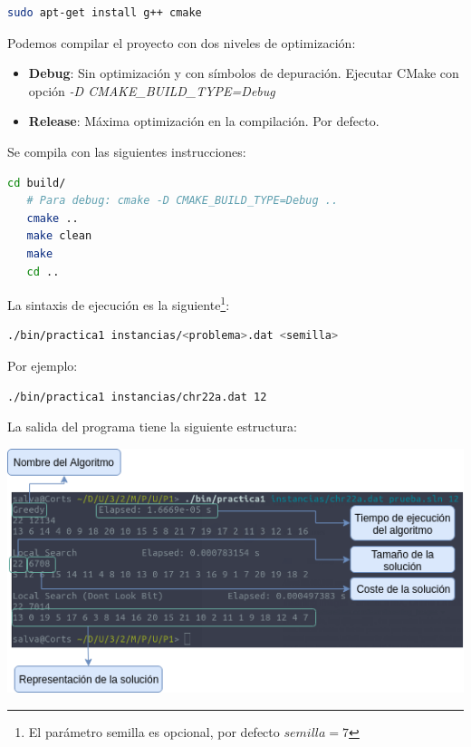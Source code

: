 \documentclass[a4paper, 12pt]{article}
\begin{document}
      \begin{lstlisting}[language=bash]
      sudo apt-get install g++ cmake 
      \end{lstlisting}
      
      Podemos compilar el proyecto con dos niveles de optimización:
      \begin{itemize}
         \item \textbf{Debug}: Sin optimización y con símbolos de depuración. Ejecutar CMake con opción \textit{-D CMAKE\_BUILD\_TYPE=Debug}
         
         \item \textbf{Release}: Máxima optimización en la compilación. Por defecto.
      \end{itemize}
      
      Se compila con las siguientes instrucciones:
      
      \begin{lstlisting}[language=bash]
   cd build/
   # Para debug: cmake -D CMAKE_BUILD_TYPE=Debug ..
   cmake ..  
   make clean
   make
   cd ..
      \end{lstlisting}
      
      \newpage
      La sintaxis de ejecución es la siguiente\footnote{El parámetro semilla es opcional, por defecto $semilla = 7$}:
      \begin{lstlisting}[language=bash]
./bin/practica1 instancias/<problema>.dat <semilla>
      \end{lstlisting}
      
      Por ejemplo:
      \begin{lstlisting}[language=bash]
./bin/practica1 instancias/chr22a.dat 12
      \end{lstlisting}
      
      La salida del programa tiene la siguiente estructura:
      \begin{center}
      \includegraphics[scale=0.7]{execOutDiagram}
      \end{center}
      
\end{document}
